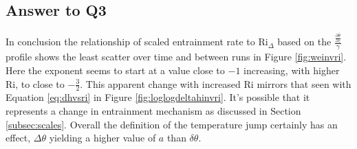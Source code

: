 \clearpage

\subsection{Answer to Q3}
In conclusion the relationship of scaled entrainment rate to \acs{Ri}$_{\Delta}$ based on the $\frac{\frac{\partial \overline{\theta}}{\partial z}}{\gamma}$ profile shows the least scatter over time and between runs in Figure \ref{fig:weinvri}.  Here the exponent seems to start at a value close to $-1$ increasing, with higher \acs{Ri}, to close to $-\frac{3}{2}$.  This apparent change with increased \acs{Ri} mirrors that seen with Equation \ref{eq:dhvsri} in Figure \ref{fig:loglogdeltahinvri}.  It's possible that it represents a change in entrainment mechanism as discussed in Section \ref{subsec:scales}.  Overall the definition of the temperature jump certainly has an effect, $\Delta \theta$ yielding a higher value of $a$ than $\delta \theta$.

\endinput

Any text after an \endinput is ignored.
You could put scraps here or things in progress.
